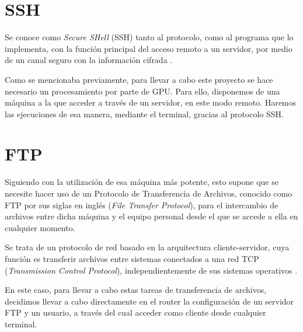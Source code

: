 \section{SSH}

Se conoce como \textit{Secure SHell} (SSH) tanto al protocolo, como al programa que lo implementa, con la función principal del acceso remoto a un servidor, por medio de un canal seguro con la información cifrada \cite{wiki:ssh}.

Como se mencionaba previamente, para llevar a cabo este proyecto se hace necesario un procesamiento por parte de GPU. Para ello, disponemos de una máquina a la que acceder a través de un servidor, en este modo remoto. Haremos las ejecuciones de esa manera, mediante el terminal, gracias al protocolo SSH.


\section{FTP}

Siguiendo con la utilización de esa máquina más potente, esto supone que se necesite hacer uso de un Protocolo de Transferencia de Archivos, conocido como FTP por sus siglas en inglés (\textit{File Transfer Protocol}), para el intercambio de archivos entre dicha máquina y el equipo personal desde el que se accede a ella en cualquier momento.

Se trata de un protocolo de red basado en la arquitectura cliente-servidor, cuya función es transferir archivos entre sistemas conectados a una red TCP (\textit{Transmission Control Protocol}), independientemente de sus sistemas operativos \cite{wiki:ftp}.

En este caso, para llevar a cabo estas tareas de transferencia de archivos, decidimos llevar a cabo directamente en el router la configuración de un servidor FTP y un usuario, a través del cual acceder como cliente desde cualquier terminal.


